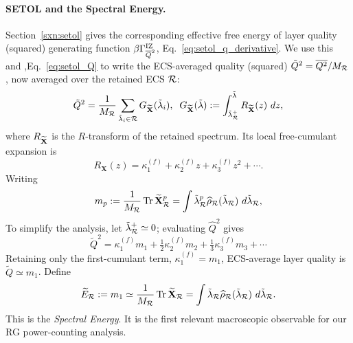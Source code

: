 \paragraph{SETOL and the Spectral Energy.}
Section~\ref{sxn:setol} gives the corresponding effective free energy of layer quality (squared)
generating function $\beta\Gamma_{\overline Q^2}^{\rm IZ}$, Eq.~\eqref{eq:setol_q_derivative}. We use this
and ,Eq.~\eqref{eq:setol_Q} to write the
ECS-averaged quality (squared)  $\tilde{Q}^{2}=\overline{Q^2}/M_{\mathcal R}$,
now averaged over the retained ECS $\mathcal R$:
\begin{equation}
\tilde{Q}^{2}
=
\frac{1}{M_{\mathcal R}}\sum_{\tilde{\lambda}_{i}\in\mathcal R}G_{\widetilde{\mathbf X}}(\tilde{\lambda}_{i}),
\;\;
G_{\widetilde{\mathbf X}}(\tilde{\lambda})
:=
\int_{\tilde{\lambda}^{+}_{\mathcal R}}^{\tilde{\lambda}}R_{\widetilde{\mathbf X}}(z)\,\,d z,
\label{eq:setol_spectral_functional}
\end{equation}
where $R_{\widetilde{\mathbf X}}$ is the $R$-transform of the retained spectrum.
Its local free-cumulant expansion is
\begin{equation}
R_{\mathbf X}(z)
=
\kappa^{(f)}_1
+\kappa^{(f)}_2z
+\kappa^{(f)}_3z^2
+\cdots.
\label{eq:rtransform_cumulants}
\end{equation}
Writing
\begin{equation}
m_p
:=
\frac{1}{M_{\mathcal R}}\operatorname{Tr}{\widetilde{\mathbf X}_{\mathcal R}^{p}}
=
\int\tilde{\lambda}_{\mathcal R}^p\widehat\rho_{\mathcal R}(\tilde{\lambda}_{\mathcal R})\,\,d\tilde{\lambda}_{\mathcal R},
\label{eq:spectral_moments}
\end{equation}
To simplify the analysis, let $\tilde{\lambda}^{+}_{\mathcal R}\simeq 0$; evaluating $\hat{Q}^{2}$ gives
\begin{equation}
\tilde{Q}^2
=
\kappa^{(f)}_1m_1
+\tfrac{1}{2}\kappa^{(f)}_2m_2
+\tfrac{1}{3}\kappa^{(f)}_3m_3
+\cdots 
\label{eq:setol_moment_expansion}
\end{equation}
Retaining only the first-cumulant term, $\kappa^{(f)}_1=m_1$, ECS-average layer quality is
$ \tilde{Q} \simeq  m_1$.
Define
\begin{equation}
\widetilde E_{\mathcal R}
:=m_1
\simeq
\frac{1}{M_{\mathcal R}}\operatorname{Tr}{\widetilde{\mathbf X}_{\mathcal R}}
=
\int\tilde{\lambda}_{\mathcal R}\widehat\rho_{\mathcal R}(\tilde{\lambda}_{\mathcal R})\,\,d\tilde{\lambda}_{\mathcal R}.
\label{eq:trace_law_energy}
\end{equation}
This is the \emph{Spectral Energy}. It is the first relevant macroscopic observable
for our RG power-counting analysis.

